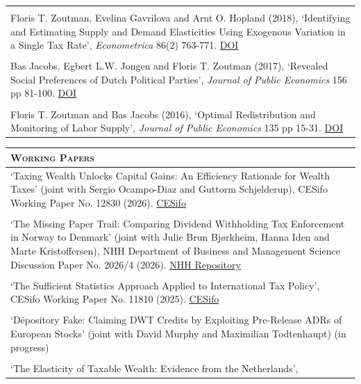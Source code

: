 \documentclass [11pt]{article}
\newcommand{\kiss}
{\vspace{0.5cm}}
\newcommand{\thickrule}{\toprule}
\newcommand{\ttitle}[1]{\scshape{\Large {#1}}}
\begin{document}
\begin{tabular}[t] { p{16.75cm}  }
\\
\\
Floris T. Zoutman, Evelina Gavrilova and Arnt O. Hopland (2018), `Identifying and Estimating Supply and Demand Elasticities Using Exogenous Variation in a Single Tax Rate', \emph{Econometrica} 86(2) 763-771. \href{https://doi.org/10.3982/ECTA15129}{DOI}
\\
\\
Bas Jacobs, Egbert L.W. Jongen and Floris T. Zoutman (2017), `Revealed Social Preferences of Dutch Political Parties', \emph{Journal of Public Economics} 156 pp 81-100. \href{https://doi.org/10.1016/j.jpubeco.2017.08.002}{DOI}
\\
\\
Floris T. Zoutman and Bas Jacobs (2016), `Optimal Redistribution and Monitoring of Labor Supply', \emph{Journal of Public Economics} 135 pp 15-31. \href{https://doi.org/10.1016/j.jpubeco.2015.12.008}{DOI}
\end{tabular}
\kiss

\begin{tabular}[t] { p{16.75cm}  }
\ttitle{Working Papers}
\\
\thickrule
`Taxing Wealth Unlocks Capital Gains: An Efficiency Rationale for Wealth Taxes' (joint with Sergio Ocampo-Diaz and Guttorm Schjelderup), CESifo Working Paper No. 12830 (2026). \href{https://www.ifo.de/en/cesifo/publications/2026/working-paper/taxing-wealth-unlocks-capital-gains-efficiency-rationale-wealth}{CESifo}
\\
\\
`The Missing Paper Trail: Comparing Dividend Withholding Tax Enforcement in Norway to Denmark' (joint with Julie Brun Bjørkheim, Hanna Iden and Marte Kristoffersen), NHH Department of Business and Management Science Discussion Paper No. 2026/4 (2026). \href{https://hdl.handle.net/11250/5518055}{NHH Repository}
\\
\\
`The Sufficient Statistics Approach Applied to International Tax Policy', CESifo Working Paper No. 11810 (2025). \href{https://www.ifo.de/en/cesifo/publications/2025/working-paper/sufficient-statistics-approach-applied-international-tax-policy}{CESifo}
\\
\\
`D\=epository Fake: Claiming DWT Credits by Exploiting Pre-Release ADRs of European Stocks' (joint with David Murphy and Maximilian Todtenhaupt) (in progress)
\\
\\
`The Elasticity of Taxable Wealth: Evidence from the Netherlands', 

\end{tabular}
\kiss
\end{document}
